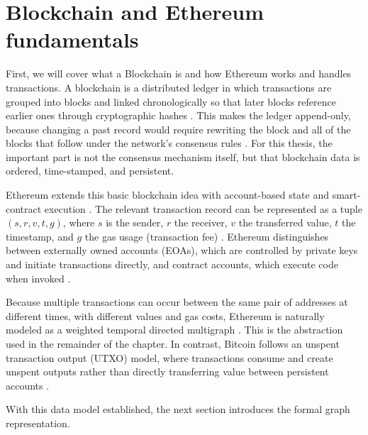 \section{Blockchain and Ethereum fundamentals}
First, we will cover what a Blockchain is and how Ethereum works and handles transactions. 
A blockchain is a distributed ledger in which transactions are grouped into blocks and linked chronologically so that later blocks reference earlier ones through cryptographic hashes \citep{nakamoto2008bitcoin, buterin2014ethereum}. This makes the ledger append-only, because changing a past record would require rewriting the block and all of the blocks that follow under the network’s consensus rules \citep{nakamoto2008bitcoin}. For this thesis, the important part is not the consensus mechanism itself, but that blockchain data is ordered, time-stamped, and persistent.

Ethereum extends this basic blockchain idea with account-based state and smart-contract execution \citep{buterin2014ethereum}. The relevant transaction record can be represented as a tuple $(s,r,v,t,g)$, where $s$ is the sender, $r$ the receiver, $v$ the transferred value, $t$ the timestamp, and $g$ the gas usage (transaction fee) \citep{alemari2021labeled, sanjalawe2023atd}. Ethereum distinguishes between externally owned accounts (EOAs), which are controlled by private keys and initiate transactions directly, and contract accounts, which execute code when invoked \citep{buterin2014ethereum, alemari2021labeled}.

Because multiple transactions can occur between the same pair of addresses at different times, with different values and gas costs, Ethereum is naturally modeled as a weighted temporal directed multigraph \citep{kovanen2011temporal, paranjape2017motifs}. This is the abstraction used in the remainder of the chapter. In contrast, Bitcoin follows an unspent transaction output (UTXO) model, where transactions consume and create unspent outputs rather than directly transferring value between persistent accounts \citep{nakamoto2008bitcoin}.

With this data model established, the next section introduces the formal graph representation.
